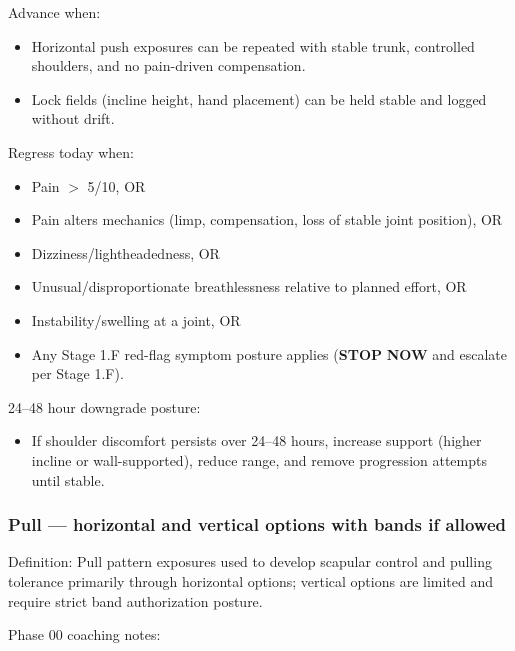 \documentclass[10pt]{article}
\begin{document}
Advance when:

\begin{itemize}
\item Horizontal push exposures can be repeated with stable trunk, controlled shoulders, and no pain-driven compensation.
\item Lock fields (incline height, hand placement) can be held stable and logged without drift.
\end{itemize}

Regress today when:

\begin{itemize}
\item Pain $>$ 5/10, OR
\item Pain alters mechanics (limp, compensation, loss of stable joint position), OR
\item Dizziness/lightheadedness, OR
\item Unusual/disproportionate breathlessness relative to planned effort, OR
\item Instability/swelling at a joint, OR
\item Any Stage 1.F red-flag symptom posture applies (\textbf{STOP} \textbf{NOW} and escalate per Stage 1.F).
\end{itemize}

24–48 hour downgrade posture:

\begin{itemize}
\item If shoulder discomfort persists over 24–48 hours, increase support (higher incline or wall-supported), reduce range, and remove progression attempts until stable.
\end{itemize}

\subsubsection*{Pull — horizontal and vertical options with bands if allowed}

Definition: Pull pattern exposures used to develop scapular control and pulling tolerance primarily through horizontal options; vertical options are limited and require strict band authorization posture.

Phase 00 coaching notes:
\end{document}

